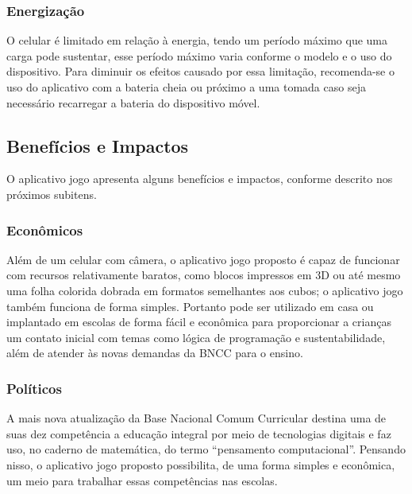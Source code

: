         \subsubsection{Energização}
        O celular é limitado em relação à energia, tendo um período máximo que uma carga pode sustentar, esse período máximo varia conforme o modelo e o uso do dispositivo. Para diminuir os efeitos causado por essa limitação, recomenda-se o uso do aplicativo com a bateria cheia ou próximo a uma tomada caso seja necessário recarregar a bateria do dispositivo móvel.   
        
    
    \subsection{Benefícios e Impactos}
    O aplicativo jogo apresenta alguns benefícios e impactos, conforme descrito nos próximos subitens.

        \subsubsection{Econômicos}
        Além de um celular com câmera, o aplicativo jogo proposto é capaz de funcionar com recursos relativamente baratos, como blocos impressos em 3D ou até mesmo uma folha colorida dobrada em formatos semelhantes aos cubos; o aplicativo jogo também funciona de forma simples. Portanto pode ser utilizado em casa ou implantado em escolas de forma fácil e econômica para proporcionar a crianças um contato inicial com temas como lógica de programação e sustentabilidade, além de atender às novas demandas da BNCC para o ensino.
        
        
        
        \subsubsection{Políticos}
        A mais nova atualização da Base Nacional Comum Curricular destina uma de suas dez competência a educação integral por meio de tecnologias digitais e faz uso, no caderno de matemática, do termo “pensamento computacional”. Pensando nisso, o aplicativo jogo proposto possibilita, de uma forma simples e econômica, um meio para trabalhar essas competências nas escolas. 


